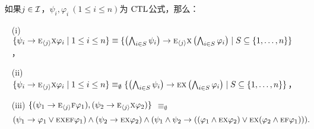 \begin{lemma}~\label{lem:In2NI}
	如果$j\in {\cal I}$，$\psi_i,\varphi_i~(1\le i\le n)$为 $\textrm{CTL}$公式，那么：
	\begin{itemize}
		\item[(i)] $\{\psi_i\rightarrow \textsc{e}_{{\langle{j}\rangle}} \textsc{x} \varphi_i \mid 1\le i\le n\}\equiv 
		\{\left(\bigwedge_{i\in S}\psi_i\right)\rightarrow \textsc{e}_{{\langle{j}\rangle}} \textsc{x} \left(\bigwedge_{i\in S}\varphi_i\right)\mid S\subseteq\{1,\dots, n\}\}$，
		
		\item[(ii)] $\{\psi_i\rightarrow \textsc{e}_{{\langle{j}\rangle}} \textsc{x} \varphi_i \mid 1\le i\le n\}\equiv_\emptyset
		\{\left(\bigwedge_{i\in S}\psi_i\right)\rightarrow \textsc{e} \textsc{x} \left(\bigwedge_{i\in S}\varphi_i\right)\mid S\subseteq\{1,\dots, n\}\}$，
		
		\item[(iii)] $\{(\psi_1 \rightarrow \textsc{e}_{{\langle{j}\rangle}}\textsc{f} \varphi_1), (\psi_2 \rightarrow \textsc{e}_{{\langle{j}\rangle}}\textsc{x} \varphi_2)\}$
		$\equiv_\emptyset$ 
		\begin{equation*}
			(\psi_1 \rightarrow \varphi_1 \vee \textsc{e} \textsc{x} \textsc{e} \textsc{f} \varphi_1)
			\wedge (\psi_2 \rightarrow \textsc{e} \textsc{x} \varphi_2)
			\wedge (\psi_1 \wedge \psi_2 \rightarrow ((\varphi_1 \wedge \textsc{e} \textsc{x} \varphi_2) \vee \textsc{e} \textsc{x} (\varphi_2 \wedge \textsc{e} \textsc{f} \varphi_1))).
		\end{equation*}
	\end{itemize}
\end{lemma}
